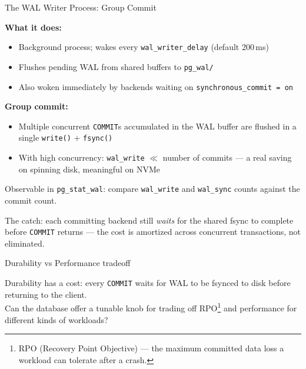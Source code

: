 \documentclass[aspectratio=169,10pt]{beamer}
\begin{document}
\begin{frame}{The WAL Writer Process: Group Commit}

  \textbf{What it does:}
  \begin{itemize}
    \item Background process; wakes every \texttt{wal\_writer\_delay}
          (default 200\,ms)
    \item Flushes pending WAL from shared buffers to \texttt{pg\_wal/}
    \item Also woken immediately by backends waiting on
          \texttt{synchronous\_commit = on}
  \end{itemize}

  \vspace{0.5em}
  \textbf{Group commit:}
  \begin{itemize}
    \item Multiple concurrent \texttt{COMMIT}s accumulated in the WAL buffer
          are flushed in a single \texttt{write()} + \texttt{fsync()}
    \item With high concurrency: \texttt{wal\_write} $\ll$ number of commits
          --- a real saving on spinning disk, meaningful on NVMe
  \end{itemize}

  \vspace{0.3em}
  {\small Observable in \texttt{pg\_stat\_wal}: compare \texttt{wal\_write}
  and \texttt{wal\_sync} counts against the commit count.}

  \vspace{0.4em}
  \alert{The catch:} each committing backend still \textit{waits} for the
  shared fsync to complete before \texttt{COMMIT} returns --- the cost is
  amortized across concurrent transactions, not eliminated.

\end{frame}

\begin{frame}{Durability vs Performance tradeoff}

  \begin{block}{}
    Durability has a cost: every \texttt{COMMIT} waits for WAL to be
    fsynced to disk before returning to the client.\\[0.4em]
    Can the database offer a tunable knob for trading off RPO\footnote{RPO (Recovery Point Objective) --- the maximum committed data loss a workload can tolerate after a crash.} and
    performance for different kinds of workloads?
  \end{block}

\end{frame}
\end{document}
